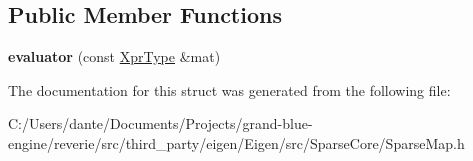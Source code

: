 \subsection*{Public Member Functions}
\begin{DoxyCompactItemize}
\item 
\mbox{\label{struct_eigen_1_1internal_1_1evaluator_3_01_map_3_01_sparse_matrix_3_01_mat_scalar_00_01_mat_optic7190da6f4a73606f624a88388745a36_a1ba51792fcae2e512a6f6c9ffb34a0c6}} 
{\bfseries evaluator} (const \mbox{\hyperlink{class_eigen_1_1_map_3_01_sparse_matrix_3_01_mat_scalar_00_01_mat_options_00_01_mat_index_01_4_002c859b470cc9e43a031929bd752a93e6}{Xpr\+Type}} \&mat)
\end{DoxyCompactItemize}


The documentation for this struct was generated from the following file\+:\begin{DoxyCompactItemize}
\item 
C\+:/\+Users/dante/\+Documents/\+Projects/grand-\/blue-\/engine/reverie/src/third\+\_\+party/eigen/\+Eigen/src/\+Sparse\+Core/Sparse\+Map.\+h\end{DoxyCompactItemize}
